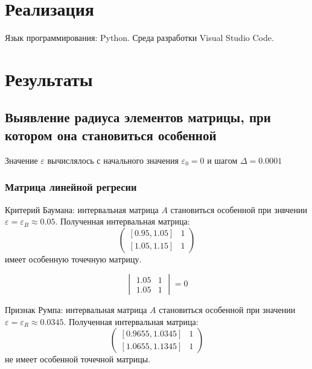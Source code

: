 \documentclass[a4paper,12pt]{article}
\begin{document}
    \section{Реализация}
    Язык программирования: Python. Среда разработки Visual Studio Code.

    \section{Результаты}
    \subsection{Выявление радиуса элементов матрицы, при котором она становиться особенной}
    Значение $ \varepsilon $ вычислялось с начального значения $ \varepsilon_{0} = 0 $ и шагом $ \Delta = 0.0001 $

    \subsubsection{Матрица линейной регресии}
    Критерий Баумана: интервальная матрица \textbf{$ A $} становиться особенной при знвчении
    $ \varepsilon = \varepsilon_{B} \approx 0.05 $.
    Полученная интервальная матрица:
    \begin{equation}
        \begin{pmatrix}
            [0.95, 1.05] & 1\\
            [1.05, 1.15] & 1
        \end{pmatrix}
    \end{equation}
    имеет особенную точечную матрицу.

    \begin{equation}
        \begin{vmatrix}
            1.05 & 1\\
            1.05 & 1
        \end{vmatrix}
        = 0
    \end{equation}

    Признак Румпа: интервальная матрица \textbf{$ A $} становиться особенной при значении
    $ \varepsilon = \varepsilon_{R} \approx 0.0345 $.
    Полученная интервальная матрица:
    \begin{equation}
        \begin{pmatrix}
            [0.9655, 1.0345] & 1\\
            [1.0655, 1.1345] & 1
        \end{pmatrix}
    \end{equation}
    не имеет особенной точечной матрицы.
\end{document}
